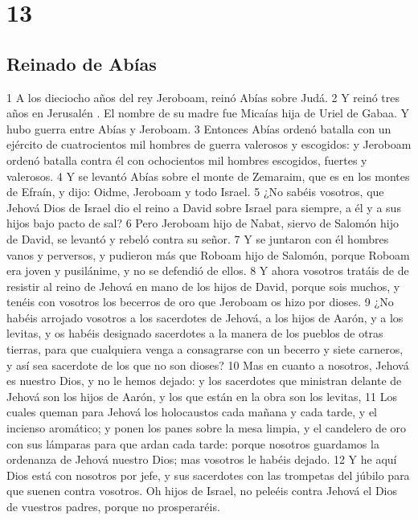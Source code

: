 \chapter{13}

\section*{Reinado de Abías}

 

1  A los dieciocho años del rey Jeroboam, reinó Abías sobre Judá.
2  Y reinó tres años en Jerusalén . El nombre de su madre fue Micaías hija de Uriel de Gabaa. Y hubo guerra entre Abías y Jeroboam.
3 Entonces Abías ordenó batalla con un ejército de cuatrocientos mil hombres de guerra valerosos y escogidos: y Jeroboam ordenó batalla contra él con ochocientos mil hombres escogidos, fuertes y valerosos.
4 Y se levantó Abías sobre el monte de Zemaraim, que es en los montes de Efraín, y dijo: Oidme, Jeroboam y todo Israel.
5 ¿No sabéis vosotros, que Jehová Dios de Israel dio el reino a David sobre Israel para siempre, a él y a sus hijos bajo pacto de sal?
6 Pero Jeroboam hijo de Nabat, siervo de Salomón hijo de David, se levantó y rebeló contra su señor.
7 Y se juntaron con él hombres vanos y perversos, y pudieron más que Roboam hijo de Salomón, porque Roboam era joven y pusilánime, y no se defendió de ellos. 
8 Y ahora vosotros tratáis de de resistir al reino de Jehová en mano de los hijos de David, porque sois muchos, y tenéis con vosotros los becerros de oro que Jeroboam os hizo por dioses.
9 ¿No habéis arrojado vosotros a los sacerdotes de Jehová, a los hijos de Aarón, y a los levitas, y os habéis designado sacerdotes a la manera de los pueblos de otras tierras, para que cualquiera venga a consagrarse con un becerro y siete carneros, y así sea sacerdote de los que no son dioses?
10 Mas en cuanto a nosotros, Jehová es nuestro Dios, y no le hemos dejado: y los sacerdotes que ministran delante de Jehová son los hijos de Aarón, y los que están en la obra son los levitas,
11 Los cuales queman para Jehová los holocaustos cada mañana y cada tarde, y el incienso aromático; y ponen los panes sobre la mesa limpia, y el candelero de oro con sus lámparas para que ardan cada tarde: porque nosotros guardamos la ordenanza de Jehová nuestro Dios; mas vosotros le habéis dejado.
12 Y he aquí Dios está con nosotros por jefe, y sus sacerdotes con las trompetas del júbilo para que suenen contra vosotros. Oh hijos de Israel, no peleéis contra Jehová el Dios de vuestros padres, porque no prosperaréis.
